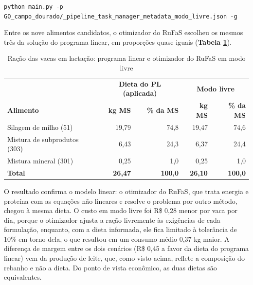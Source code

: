\documentclass[a4paper,12pt]{article}
\begin{document}
\begin{lstlisting}[caption={Execução do cenário em modo livre.}, label={lst:modolivre}]
python main.py -p GO_campo_dourado/_pipeline_task_manager_metadata_modo_livre.json -g
\end{lstlisting}

Entre os nove alimentos candidatos, o otimizador do RuFaS escolheu os mesmos três da solução do programa linear, em proporções quase iguais (\textbf{Tabela \ref{tab:modolivre}}).

\begin{table}[htbp]
    \centering
    \caption{Ração das vacas em lactação: programa linear e otimizador do RuFaS em modo livre}
    \label{tab:modolivre}
    \begin{tabular}{lrrrr}
        \toprule
        & \multicolumn{2}{c}{\textbf{Dieta do PL (aplicada)}} & \multicolumn{2}{c}{\textbf{Modo livre}} \\
        \textbf{Alimento} & \textbf{kg MS} & \textbf{\% da MS} & \textbf{kg MS} & \textbf{\% da MS} \\
        \midrule
        \rowcolor{gray!15}
        Silagem de milho (51) & 19,79 & 74,8 & 19,47 & 74,6 \\
        Mistura de subprodutos (303) & 6,43 & 24,3 & 6,37 & 24,4 \\
        \rowcolor{gray!15}
        Mistura mineral (301) & 0,25 & 1,0 & 0,25 & 1,0 \\
        \midrule
        \textbf{Total} & \textbf{26,47} & \textbf{100,0} & \textbf{26,10} & \textbf{100,0} \\
        \bottomrule
    \end{tabular}
\end{table}

O resultado confirma o modelo linear: o otimizador do RuFaS, que trata energia e proteína com as equações não lineares e resolve o problema por outro método, chegou à mesma dieta. O custo em modo livre foi R\$ 0,28 menor por vaca por dia, porque o otimizador ajusta a ração livremente às exigências de cada formulação, enquanto, com a dieta informada, ele fica limitado à tolerância de 10\% em torno dela, o que resultou em um consumo médio 0,37 kg maior. A diferença de margem entre os dois cenários (R\$ 0,45 a favor da dieta do programa linear) vem da produção de leite, que, como visto acima, reflete a composição do rebanho e não a dieta. Do ponto de vista econômico, as duas dietas são equivalentes.

\end{document}
